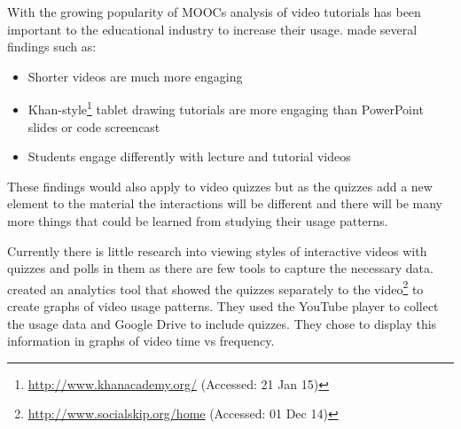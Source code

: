 With the growing popularity of \glspl{MOOC} analysis of video tutorials has been important to the educational industry to increase their usage.  \citep{engagement} made several findings such as:
\begin{itemize}
\item Shorter videos are much more engaging
\item Khan-style\footnote{\url{http://www.khanacademy.org/} (Accessed: 21 Jan 15)} tablet drawing tutorials are more engaging than PowerPoint slides or code screencast
\item Students engage differently with lecture and tutorial videos
\end{itemize}
These findings would also apply to video quizzes but as the quizzes add a new element to the material the interactions will be different and there will be many more things that could be learned from studying their usage patterns.

Currently there is little research into viewing styles of interactive videos with quizzes and polls in them as there are few tools to capture the necessary data.  \citep{videoAnalytics} created an analytics tool that showed the quizzes separately to the video\footnote{\url{http://www.socialskip.org/home} (Accessed: 01 Dec 14)} to create graphs of video usage patterns. They used the YouTube player to collect the usage data and Google Drive to include quizzes. They chose to display this information in graphs of video time vs frequency.
